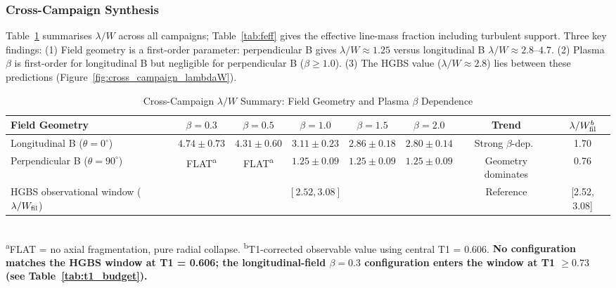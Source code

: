 \documentclass[twoside,twocolumn]{mnras}
\begin{document}
\subsubsection{Cross-Campaign Synthesis}

Table~\ref{tab:cross_campaign} summarises $\lambda/W$ across all campaigns; Table~\ref{tab:feff}
gives the effective line-mass fraction including turbulent support. Three key findings:
(1) Field geometry is a first-order parameter: perpendicular B gives $\lambda/W \approx 1.25$
versus longitudinal B $\lambda/W \approx 2.8$--$4.7$. (2) Plasma $\beta$ is first-order
for longitudinal B but negligible for perpendicular B ($\beta \geq 1.0$).
(3) The HGBS value ($\lambda/W \approx 2.8$) lies between these predictions
(Figure~\ref{fig:cross_campaign_lambdaW}).

\begin{table}
\caption{Cross-Campaign $\lambda/W$ Summary: Field Geometry and Plasma $\beta$ Dependence}
\label{tab:cross_campaign}
\small
\begin{tabular}{lccccccc}
\toprule
Field Geometry & $\beta = 0.3$ & $\beta = 0.5$ & $\beta = 1.0$ & $\beta = 1.5$ & $\beta = 2.0$ & Trend & $\lambda/W_{\rm fil}^{b}$ \\
\midrule
Longitudinal B ($\theta = 0^\circ$) & $4.74 \pm 0.73$ & $4.31 \pm 0.60$ & $3.11 \pm 0.23$ & $2.86 \pm 0.18$ & $2.80 \pm 0.14$ & Strong $\beta$-dep.\ & 1.70 \\
Perpendicular B ($\theta = 90^\circ$) & FLAT\textsuperscript{a} & FLAT\textsuperscript{a} & $1.25 \pm 0.09$ & $1.25 \pm 0.09$ & $1.25 \pm 0.09$ & Geometry dominates & 0.76 \\
\midrule
HGBS observational window ($\lambda/W_{\rm fil}$) & \multicolumn{5}{c}{$[2.52, 3.08]$} & Reference & [2.52, 3.08] \\
\bottomrule
\end{tabular}
\\[2pt]
\footnotesize
\textsuperscript{a}FLAT = no axial fragmentation, pure radial collapse. \hspace{1em}
\textsuperscript{b}T1-corrected observable value using central T1 = 0.606. \textbf{No configuration matches the HGBS window at T1 = 0.606; the longitudinal-field $\beta=0.3$ configuration enters the window at T1 $\geq 0.73$ (see Table~\ref{tab:t1_budget}).}
\end{table}
\end{document}
